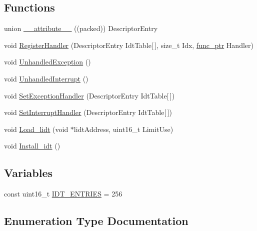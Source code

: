 \subsection*{Functions}
\begin{DoxyCompactItemize}
\item 
union \hyperlink{namespace_i_n_t_r_p_a626306273908f18155dca2fc7092a8e8}{\+\_\+\+\_\+attribute\+\_\+\+\_\+} ((packed)) Descriptor\+Entry
\item 
void \hyperlink{namespace_i_n_t_r_p_a91a6a2668bfa9961a9ed265f6ceac47d}{Register\+Handler} (Descriptor\+Entry Idt\+Table\mbox{[}$\,$\mbox{]}, size\+\_\+t Idx, \hyperlink{ktypes_8h_a46bbb9e776183ed6a8eca9d919756434}{func\+\_\+ptr} Handler)
\item 
void \hyperlink{namespace_i_n_t_r_p_a7732859732913734b09dd07030c41991}{Unhandled\+Exception} ()
\item 
void \hyperlink{namespace_i_n_t_r_p_a13c03019c9d7b305743516310096a82a}{Unhandled\+Interrupt} ()
\item 
void \hyperlink{namespace_i_n_t_r_p_a4a1a1ff73a4e9bb1c17daf205170daa9}{Set\+Exception\+Handler} (Descriptor\+Entry Idt\+Table\mbox{[}$\,$\mbox{]})
\item 
void \hyperlink{namespace_i_n_t_r_p_abf09ee877603981fe255cd050cbbb110}{Set\+Interrupt\+Handler} (Descriptor\+Entry Idt\+Table\mbox{[}$\,$\mbox{]})
\item 
void \hyperlink{namespace_i_n_t_r_p_a194f85d6c873615e9125466e3b23c30f}{Load\+\_\+lidt} (void $\ast$lidt\+Address, uint16\+\_\+t Limit\+Use)
\item 
void \hyperlink{namespace_i_n_t_r_p_a139b273cc1e45d3c2fdfe0d387a98518}{Install\+\_\+idt} ()
\end{DoxyCompactItemize}
\subsection*{Variables}
\begin{DoxyCompactItemize}
\item 
const uint16\+\_\+t \hyperlink{namespace_i_n_t_r_p_a1022b4dc1d9af1ea393f7f038ff421ce}{I\+D\+T\+\_\+\+E\+N\+T\+R\+I\+ES} = 256
\end{DoxyCompactItemize}


\subsection{Enumeration Type Documentation}
\mbox{\label{namespace_i_n_t_r_p_a790699fb2953ef4ab70c7dc7148a1c94}} 
